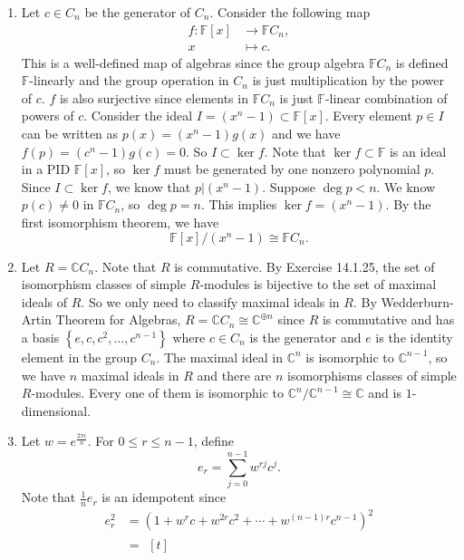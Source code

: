 \documentclass[a4paper, 12pt]{article}
\begin{document}
\begin{solution}
\begin{enumerate}[(1)]
\item Let \(c\in C_n\) be the generator of \(C_n\). Consider the following map 
\begin{align*}
    f:\mathbb{F}[x]&\rightarrow \mathbb{F}C_n,\\ 
    x&\mapsto c.
\end{align*}
This is a well-defined map of algebras since the group algebra \(\mathbb{F}C_n\) is defined \(\mathbb{F}\)-linearly and the group operation in \(C_n\) is just multiplication by the power of \(c\). \(f\) is also surjective since 
elements in \(\mathbb{F}C_n\) is just \(\mathbb{F}\)-linear combination of powers of \(c\). Consider the ideal \(I=(x^n-1)\subset \mathbb{F}[x]\). Every element \(p\in I\) can be written as 
\(p(x)=(x^n-1)g(x)\) and we have \(f(p)=(c^n-1)g(c)=0\). So \(I\subset \ker f\). Note that \(\ker f\subset \mathbb{F}\) is an ideal in a PID \(\mathbb{F}[x]\), so \(\ker f\) must be generated by one nonzero polynomial \(p\). Since \(I\subset \ker f\), we know that 
\(p|(x^n-1)\). Suppose \(\deg p<n\). We know \(p(c)\neq 0\) in \(\mathbb{F}C_n\), so \(\deg p=n\). This implies \(\ker f=(x^n-1)\). By the first isomorphism theorem, we have 
\[\mathbb{F}[x]/(x^n-1)\cong \mathbb{F}C_n.\]
\item Let \(R=\mathbb{C}C_n\). Note that \(R\) is commutative. By Exercise 14.1.25, the set of isomorphism classes of simple \(R\)-modules is bijective to the set of maximal ideals of \(R\). So we only need to classify maximal ideals in \(R\). By Wedderburn-Artin Theorem for Algebras, 
\(R=\mathbb{C}C_n\cong \mathbb{C}^{\oplus n}\) since \(R\) is commutative and has a basis \(\left\{ e,c,c^2,\ldots,c^{n-1} \right\}\) where \(c\in C_n\) is the generator and \(e\) is the identity element in the group \(C_n\). The maximal ideal in \(\mathbb{C}^n\) is isomorphic to \(\mathbb{C}^{n-1}\), so we 
have \(n\) maximal ideals in \(R\) and there are \(n\) isomorphisms classes of simple \(R\)-modules. Every one of them is isomorphic to \(\mathbb{C}^n/\mathbb{C}^{n-1}\cong \mathbb{C}\) and is \(1\)-dimensional. 
\item Let \(w=e^{\frac{2\pi i}{n}}\). For \(0\leq r\leq n-1\), define 
\[e_r=\sum_{j=0}^{n-1} w^{rj} c^j.\]
Note that \(\frac{1}{n}e_r\) is an idempotent since 
\begin{align*}
    e_r^2&=(1+w^r c+w^{2r} c^2+\cdots+w^{(n-1)r}c^{n-1})^2\\ 
         &=\begin{aligned}[t]

\end{aligned}
\end{align*}
\end{enumerate}
\end{solution}
\end{document}
